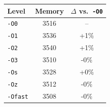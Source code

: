 \begin{tabular*}{\columnwidth}{@{\extracolsep\fill}lcc@{\extracolsep\fill}}
\toprule
\textbf{Level} & \textbf{Memory} & \textbf{$\Delta$ vs.\ \texttt{-O0}} \\
\midrule
\texttt{-O0} & 3516 & -- \\
\texttt{-O1} & 3536 & +1\% \\
\texttt{-O2} & 3540 & +1\% \\
\texttt{-O3} & 3510 & -0\% \\
\texttt{-Os} & 3528 & +0\% \\
\texttt{-Oz} & 3512 & -0\% \\
\texttt{-Ofast} & 3508 & -0\% \\
\bottomrule
\end{tabular*}
